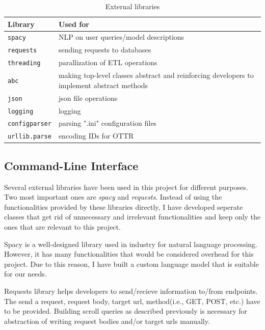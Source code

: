 \begin{table}[H]
	\centering
	\begin{tabular}{|p{}|p{}|}
		\hline
		\textbf{Library} & \textbf{Used for} \\
		\hline
		\texttt{spacy} & NLP on user queries/model descriptions \\
		\hline
		\texttt{requests} & sending requests to databases \\
		\hline
		\texttt{threading} & parallization of ETL operations \\
		\hline
		\texttt{abc} & making top-level classes abstract and reinforcing developers to 
		implement abstract methods \\
		\hline
		\texttt{json} & json file operations \\
		\hline
		\texttt{logging} & logging \\
		\hline
		\texttt{configparser} & parsing ".ini" configuration files \\
		\hline
		\texttt{urllib.parse} & encoding IDs for OTTR \\
		\hline
	\end{tabular}
	\caption{External libraries}
	\label{tab:external_libraries}
\end{table}

\subsection{Command-Line Interface}

Several external libraries have been used in this project for different purposes. Two most important 
ones are \textit{spacy} and \textit{requests}. Instead of using the functionalities provided by these 
libraries directly, I have developed seperate classes that get rid of unnecessary and irrelevant 
functionalities and keep only the ones that are relevant to this project.

Spacy is a well-designed library used in industry for natural language processing. However, it has 
many functionalities that would be considered overhead for this project. Due to this reason, 
I have built a custom language model that is suitable for our needs.

Requests library helps developers to send/recieve information to/from endpoints. The send a request, 
request body, target url, method(i.e., GET, POST, etc.) have to be provided. Building scroll queries 
as described previously is necessary for abstraction of writing request bodies and/or target urls 
manually.

